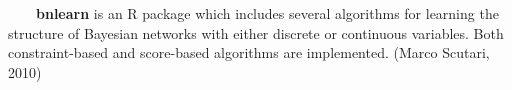 ~~~~\textbf{bnlearn} is an R package which includes several algorithms for learning the structure of Bayesian networks with either discrete or continuous variables. Both constraint-based and score-based algorithms are implemented. (Marco Scutari, 2010)